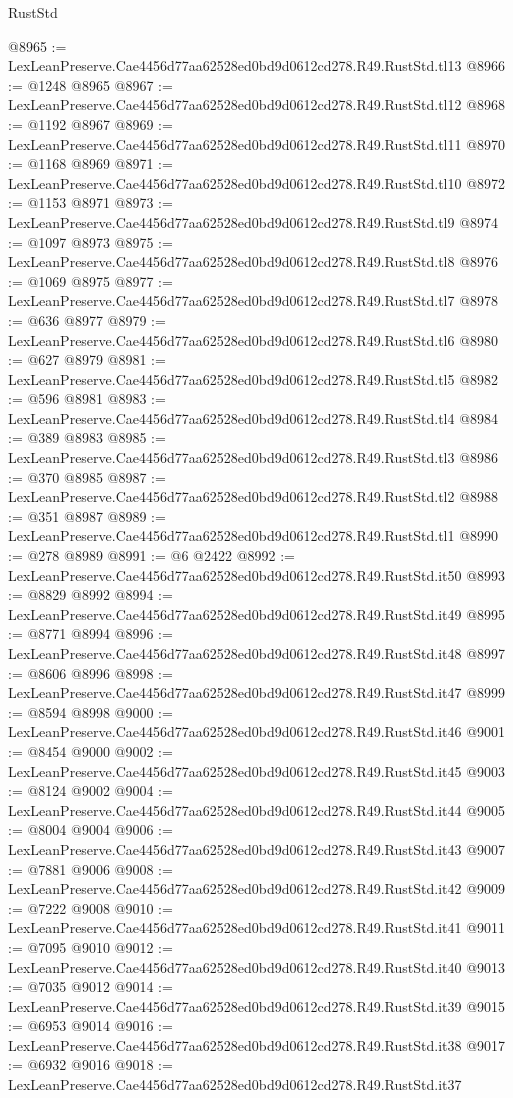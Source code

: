 \begin{lexlean}{RustStd}
\begin{coremodule}
@8965 := LexLeanPreserve.Cae4456d77aa62528ed0bd9d0612cd278.R49.RustStd.tl13
@8966 := @1248 @8965
@8967 := LexLeanPreserve.Cae4456d77aa62528ed0bd9d0612cd278.R49.RustStd.tl12
@8968 := @1192 @8967
@8969 := LexLeanPreserve.Cae4456d77aa62528ed0bd9d0612cd278.R49.RustStd.tl11
@8970 := @1168 @8969
@8971 := LexLeanPreserve.Cae4456d77aa62528ed0bd9d0612cd278.R49.RustStd.tl10
@8972 := @1153 @8971
@8973 := LexLeanPreserve.Cae4456d77aa62528ed0bd9d0612cd278.R49.RustStd.tl9
@8974 := @1097 @8973
@8975 := LexLeanPreserve.Cae4456d77aa62528ed0bd9d0612cd278.R49.RustStd.tl8
@8976 := @1069 @8975
@8977 := LexLeanPreserve.Cae4456d77aa62528ed0bd9d0612cd278.R49.RustStd.tl7
@8978 := @636 @8977
@8979 := LexLeanPreserve.Cae4456d77aa62528ed0bd9d0612cd278.R49.RustStd.tl6
@8980 := @627 @8979
@8981 := LexLeanPreserve.Cae4456d77aa62528ed0bd9d0612cd278.R49.RustStd.tl5
@8982 := @596 @8981
@8983 := LexLeanPreserve.Cae4456d77aa62528ed0bd9d0612cd278.R49.RustStd.tl4
@8984 := @389 @8983
@8985 := LexLeanPreserve.Cae4456d77aa62528ed0bd9d0612cd278.R49.RustStd.tl3
@8986 := @370 @8985
@8987 := LexLeanPreserve.Cae4456d77aa62528ed0bd9d0612cd278.R49.RustStd.tl2
@8988 := @351 @8987
@8989 := LexLeanPreserve.Cae4456d77aa62528ed0bd9d0612cd278.R49.RustStd.tl1
@8990 := @278 @8989
@8991 := @6 @2422
@8992 := LexLeanPreserve.Cae4456d77aa62528ed0bd9d0612cd278.R49.RustStd.it50
@8993 := @8829 @8992
@8994 := LexLeanPreserve.Cae4456d77aa62528ed0bd9d0612cd278.R49.RustStd.it49
@8995 := @8771 @8994
@8996 := LexLeanPreserve.Cae4456d77aa62528ed0bd9d0612cd278.R49.RustStd.it48
@8997 := @8606 @8996
@8998 := LexLeanPreserve.Cae4456d77aa62528ed0bd9d0612cd278.R49.RustStd.it47
@8999 := @8594 @8998
@9000 := LexLeanPreserve.Cae4456d77aa62528ed0bd9d0612cd278.R49.RustStd.it46
@9001 := @8454 @9000
@9002 := LexLeanPreserve.Cae4456d77aa62528ed0bd9d0612cd278.R49.RustStd.it45
@9003 := @8124 @9002
@9004 := LexLeanPreserve.Cae4456d77aa62528ed0bd9d0612cd278.R49.RustStd.it44
@9005 := @8004 @9004
@9006 := LexLeanPreserve.Cae4456d77aa62528ed0bd9d0612cd278.R49.RustStd.it43
@9007 := @7881 @9006
@9008 := LexLeanPreserve.Cae4456d77aa62528ed0bd9d0612cd278.R49.RustStd.it42
@9009 := @7222 @9008
@9010 := LexLeanPreserve.Cae4456d77aa62528ed0bd9d0612cd278.R49.RustStd.it41
@9011 := @7095 @9010
@9012 := LexLeanPreserve.Cae4456d77aa62528ed0bd9d0612cd278.R49.RustStd.it40
@9013 := @7035 @9012
@9014 := LexLeanPreserve.Cae4456d77aa62528ed0bd9d0612cd278.R49.RustStd.it39
@9015 := @6953 @9014
@9016 := LexLeanPreserve.Cae4456d77aa62528ed0bd9d0612cd278.R49.RustStd.it38
@9017 := @6932 @9016
@9018 := LexLeanPreserve.Cae4456d77aa62528ed0bd9d0612cd278.R49.RustStd.it37

\end{coremodule}
\end{lexlean}

